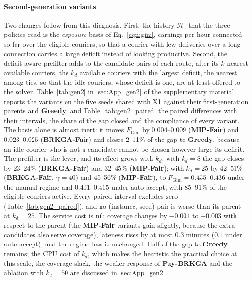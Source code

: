 \documentclass[a4paper,11pt,review,3p,authoryear]{elsarticle}
\newcommand{\Hist}{\mathcal{H}}
\newcommand{\FG}{F_{\text{Gini}}}
\begin{document}
\paragraph{Second-generation variants} Two changes follow from this diagnosis. First, the history $\Hist_t$ that the three policies read is the \emph{exposure} basis of Eq.~\eqref{eqn:gini}, earnings per hour connected so far over the eligible couriers, so that a courier with few deliveries over a long connection carries a large deficit instead of looking productive. Second, the deficit-aware prefilter adds to the candidate pairs of each route, after its $k$ nearest available couriers, the $k_d$ available couriers with the largest deficit, the nearest among ties, so that the idle couriers, whose deficit is one, are at least offered to the solver. Table~\ref{tab:gen2} in \ref{sec:App_gen2} of the supplementary material reports the variants on the five seeds shared with X1 against their first-generation parents and \textbf{Greedy}, and Table~\ref{tab:gen2_paired} the paired differences with their intervals, the share of the gap closed and the compliance of every variant. The basis alone is almost inert: it moves $\FG$ by $0.004$--$0.009$ (\textbf{MIP-Fair}) and $0.023$--$0.025$ (\textbf{BRKGA-Fair}) and closes 2--11\% of the gap to \textbf{Greedy}, because an idle courier who is not a candidate cannot be chosen however large its deficit. The prefilter is the lever, and its effect grows with $k_d$: with $k_d = 8$ the gap closes by 23--24\% (\textbf{BRKGA-Fair}) and 32--45\% (\textbf{MIP-Fair}); with $k_d = 25$ by 42--51\% (\textbf{BRKGA-Fair}, $\gamma = 40$) and 45--56\% (\textbf{MIP-Fair}), to $\FG = 0.435$--$0.436$ under the manual regime and $0.401$--$0.415$ under auto-accept, with 85--91\% of the eligible couriers active. Every paired interval excludes zero (Table~\ref{tab:gen2_paired}), and no (instance, seed) pair is worse than its parent at $k_d = 25$. The service cost is nil: coverage changes by $-0.001$ to $+0.003$ with respect to the parent (the \textbf{MIP-Fair} variants gain slightly, because the extra candidates also serve coverage), lateness rises by at most $0.3$ minutes ($0.1$ under auto-accept), and the regime loss is unchanged. Half of the gap to \textbf{Greedy} remains; the CPU cost of $k_d$, which makes the heuristic the practical choice at this scale, the coverage slack, the weaker response of \textbf{Pay-BRKGA} and the ablation with $k_d = 50$ are discussed in \ref{sec:App_gen2}.
\end{document}
